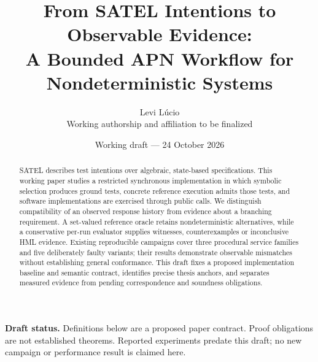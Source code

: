 \documentclass[11pt,a4paper]{article}
\title{From SATEL Intentions to Observable Evidence:\\
A Bounded APN Workflow for Nondeterministic Systems}
\author{Levi L\'ucio\\\small Working authorship and affiliation to be finalized}
\date{Working draft --- 24 October 2026}
\begin{document}
\maketitle
\begin{abstract}
SATEL describes test intentions over algebraic, state-based specifications.
This working paper studies a restricted synchronous implementation in which
symbolic selection produces ground tests, concrete reference execution admits
those tests, and software implementations are exercised through public calls.
We distinguish compatibility of an observed response history from evidence about
a branching requirement. A set-valued reference oracle retains nondeterministic
alternatives, while a conservative per-run evaluator supplies witnesses,
counterexamples or inconclusive HML evidence. Existing reproducible campaigns
cover three procedural service families and five deliberately faulty variants;
their results demonstrate observable mismatches without establishing general
conformance. This draft fixes a proposed implementation baseline and semantic
contract, identifies precise thesis anchors, and separates measured evidence from
pending correspondence and soundness obligations.
\end{abstract}
\noindent\textbf{Draft status.} Definitions below are a proposed paper contract.
Proof obligations are not established theorems. Reported experiments predate this
draft; no new campaign or performance result is claimed here.







\clearpage
\begingroup
\small\raggedright


\endgroup
\end{document}
